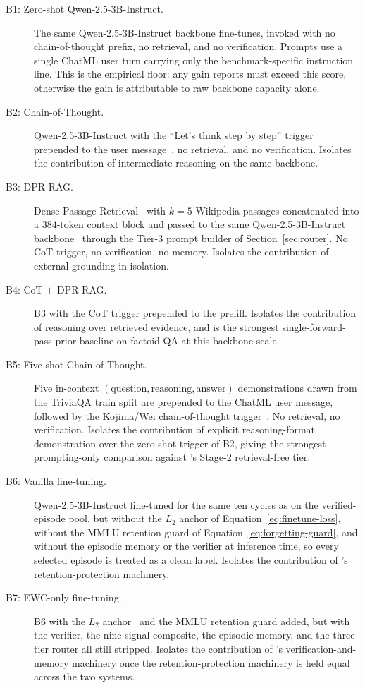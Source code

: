 \begin{description}
  \item[B1: Zero-shot Qwen-2.5-3B-Instruct.]
  The same Qwen-2.5-3B-Instruct backbone \caem{} fine-tunes, invoked with no chain-of-thought prefix, no retrieval, and no verification. Prompts use a single ChatML user turn carrying only the benchmark-specific instruction line. This is the empirical floor: any gain \caem{} reports must exceed this score, otherwise the gain is attributable to raw backbone capacity alone.

  \item[B2: Chain-of-Thought.]
  Qwen-2.5-3B-Instruct with the ``Let's think step by step'' trigger prepended to the user message~\cite{wei2022chain}, no retrieval, and no verification. Isolates the contribution of intermediate reasoning on the same backbone.

  \item[B3: DPR-RAG.]
  Dense Passage Retrieval~\cite{karpukhin-etal-2020-dense} with $k = 5$ Wikipedia passages concatenated into a $384$-token context block and passed to the same Qwen-2.5-3B-Instruct backbone~\cite{NEURIPS2020_6b493230} through the Tier-3 prompt builder of Section~\ref{sec:router}. No CoT trigger, no verification, no memory. Isolates the contribution of external grounding in isolation.

  \item[B4: CoT $+$ DPR-RAG.]
  B3 with the CoT trigger prepended to the prefill. Isolates the contribution of reasoning over retrieved evidence, and is the strongest single-forward-pass prior baseline on factoid QA at this backbone scale.

  \item[B5: Five-shot Chain-of-Thought.]
  Five in-context $(\text{question}, \text{reasoning}, \text{answer})$ demonstrations drawn from the TriviaQA train split are prepended to the ChatML user message, followed by the Kojima/Wei chain-of-thought trigger~\cite{wei2022chain}. No retrieval, no verification. Isolates the contribution of explicit reasoning-format demonstration over the zero-shot trigger of B2, giving the strongest prompting-only comparison against \caem{}'s Stage-2 retrieval-free tier.

  \item[B6: Vanilla fine-tuning.]
  Qwen-2.5-3B-Instruct fine-tuned for the same ten cycles as \caem{} on the verified-episode pool, but without the $L_{2}$ anchor of Equation~\ref{eq:finetune-loss}, without the MMLU retention guard of Equation~\ref{eq:forgetting-guard}, and without the episodic memory or the verifier at inference time, so every selected episode is treated as a clean label. Isolates the contribution of \caem{}'s retention-protection machinery.

  \item[B7: EWC-only fine-tuning.]
  B6 with the $L_{2}$ anchor~\cite{doi:10.1073/pnas.1611835114} and the MMLU retention guard added, but with the verifier, the nine-signal composite, the episodic memory, and the three-tier router all still stripped. Isolates the contribution of \caem{}'s verification-and-memory machinery once the retention-protection machinery is held equal across the two systems.
\end{description}

